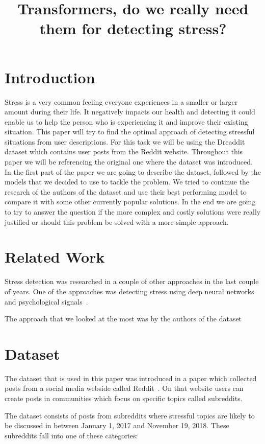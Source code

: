\documentclass[10pt, a4paper]{article}
\title{Transformers, do we really need them for detecting stress?}
\begin{document}
\maketitleabstract

\section{Introduction}

Stress is a very common feeling everyone experiences in a smaller or larger amount during their life.
It negatively impacts our health and detecting it could enable us to help the person who is experiencing it and improve their existing situation.
This paper will try to find the optimal approach of detecting stressful situations from user descriptions.
For this task we will be using the Dreaddit dataset which contains user posts from the Reddit website.
Throughout this paper we will be referencing the original one where the dataset was introduced.
\hfill \break
\hfill \break
In the first part of the paper we are going to describe the dataset, followed by the models that we decided to use to tackle the problem.
We tried to continue the research of the authors of the dataset and use their best performing model to compare it with some other currently popular solutions.
In the end we are going to try to answer the question if the more complex and costly solutions were really justified or should this problem be solved with a more simple approach.

\section{Related Work}
Stress detection was researched in a couple of other approaches in the last couple of years.
One of the approaches was detecting stress using deep neural networks and psychological signals~\citep{stress-neural}.

The approach that we looked at the most was by the authors of the dataset\

\section{Dataset}

The dataset that is used in this paper was introduced in a paper which collected posts from a social media webside called Reddit~\citep{turcan-mckeown-2019-dreaddit}.
On that website users can create posts in communities which focus on specific topics called subreddits.

The dataset consists of posts from subreddits where stressful topics are likely to be discussed in between January 1, 2017 and November 19, 2018.
These subreddits fall into one of these categories:
\end{document}
